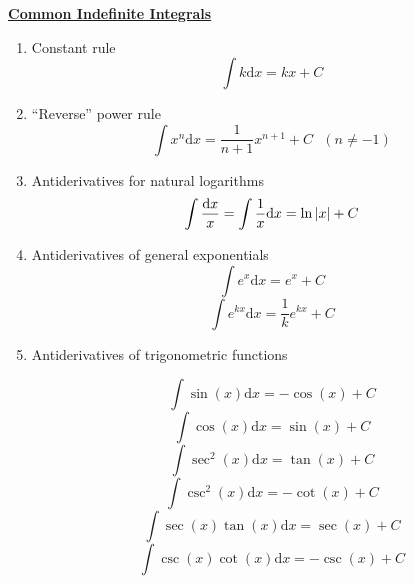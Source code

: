 \documentclass{siproblemset}
\begin{document}
    \thispagestyle{empty}
    \begin{center}
    \textbf{\underline{Common Indefinite Integrals}}
    \end{center}
    \begin{multicols}{2}
        \begin{enumerate}
            \item Constant rule
            $$\int k\text{d}x=kx+C$$
            \item ``Reverse'' power rule
            $$\int x^n\text{d}x=\dfrac{1}{n+1}x^{n+1}+C ~~~ (n\neq-1)$$
            \item Antiderivatives for natural logarithms
            $$\int \dfrac{\text{d}x}{x}=\int \dfrac{1}{x}\text{d}x=\ln\abs{x}+C$$
            \item Antiderivatives of general exponentials
            $$\int e^{x}\text{d}x=e^{x}+C$$
            $$\int e^{kx}\text{d}x=\dfrac1ke^{kx}+C$$
            \item Antiderivatives of trigonometric functions
            
            $$\int \sin(x)\text{d}x=-\cos(x)+C$$
            $$\int \cos(x)\text{d}x=\sin(x)+C$$
            $$\int \sec^2(x)\text{d}x=\tan(x)+C$$
            $$\int \csc^2(x)\text{d}x=-\cot(x)+C$$
            $$\int \sec(x)\tan(x)\text{d}x=\sec(x)+C$$
            $$\int \csc(x)\cot(x)\text{d}x=-\csc(x)+C$$
        \end{enumerate}
    \end{multicols}
\end{document}
